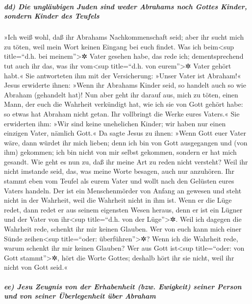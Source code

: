\hypertarget{dd-die-ungluxe4ubigen-juden-sind-weder-abrahams-noch-gottes-kinder-sondern-kinder-des-teufels}{%
\subparagraph{dd) Die ungläubigen Juden sind weder Abrahams noch Gottes
Kinder, sondern Kinder des
Teufels}\label{dd-die-ungluxe4ubigen-juden-sind-weder-abrahams-noch-gottes-kinder-sondern-kinder-des-teufels}}

 »Ich weiß wohl, daß ihr Abrahams Nachkommenschaft seid;
aber ihr sucht mich zu töten, weil mein Wort keinen Eingang bei euch
findet.  Was ich beim\textless sup title=``d.h. bei
meinem''\textgreater✲ Vater gesehen habe, das rede ich; dementsprechend
tut auch ihr das, was ihr vom\textless sup title=``d.h. von
eurem''\textgreater✲ Vater gehört habt.«  Sie antworteten
ihm mit der Versicherung: »Unser Vater ist Abraham!« Jesus erwiderte
ihnen: »Wenn ihr Abrahams Kinder seid, so handelt auch so wie Abraham
(gehandelt hat)!  Nun aber geht ihr darauf aus, mich zu
töten, einen Mann, der euch die Wahrheit verkündigt hat, wie ich sie von
Gott gehört habe: so etwas hat Abraham nicht getan.  Ihr
vollbringt die Werke eures Vaters.« Sie erwiderten ihm: »Wir sind keine
unehelichen Kinder; wir haben nur einen einzigen Vater, nämlich Gott.«
 Da sagte Jesus zu ihnen: »Wenn Gott euer Vater wäre,
dann würdet ihr mich lieben; denn ich bin von Gott ausgegangen und (von
ihm) gekommen; ich bin nicht von mir selbst gekommen, sondern er hat
mich gesandt.  Wie geht es nun zu, daß ihr meine Art zu
reden nicht versteht? Weil ihr nicht imstande seid, das, was meine Worte
besagen, auch nur anzuhören.  Ihr stammt eben vom Teufel
als eurem Vater und wollt nach den Gelüsten eures Vaters handeln. Der
ist ein Menschenmörder von Anfang an gewesen und steht nicht in der
Wahrheit, weil die Wahrheit nicht in ihm ist. Wenn er die Lüge redet,
dann redet er aus seinem eigensten Wesen heraus, denn er ist ein Lügner
und der Vater von ihr\textless sup title=``d.h. von der
Lüge''\textgreater✲.  Weil ich dagegen die Wahrheit rede,
schenkt ihr mir keinen Glauben.  Wer von euch kann mich
einer Sünde zeihen\textless sup title=``oder: überführen''\textgreater✲?
Wenn ich die Wahrheit rede, warum schenkt ihr mir keinen Glauben?
 Wer aus Gott ist\textless sup title=``oder: von Gott
stammt''\textgreater✲, hört die Worte Gottes; deshalb hört ihr sie
nicht, weil ihr nicht von Gott seid.«

\hypertarget{ee-jesu-zeugnis-von-der-erhabenheit-bzw.-ewigkeit-seiner-person-und-von-seiner-uxfcberlegenheit-uxfcber-abraham}{%
\subparagraph{ee) Jesu Zeugnis von der Erhabenheit (bzw. Ewigkeit)
seiner Person und von seiner Überlegenheit über
Abraham}\label{ee-jesu-zeugnis-von-der-erhabenheit-bzw.-ewigkeit-seiner-person-und-von-seiner-uxfcberlegenheit-uxfcber-abraham}}

